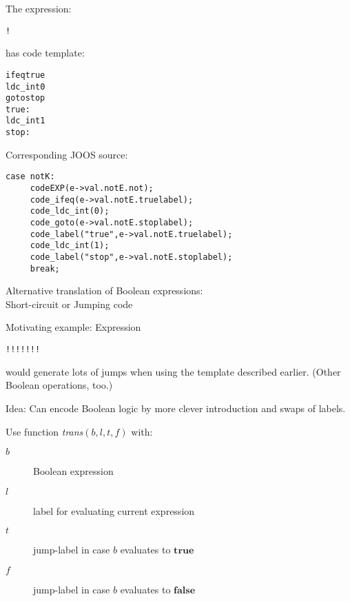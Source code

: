 \begin{slide*}
The expression:
 
\begin{scriptsize}
\begin{alltt}
    !
\end{alltt}
\end{scriptsize}
 
has code template:
 
\begin{scriptsize}
\begin{alltt}
    ifeq true
    ldc_int 0
    goto stop
    true:
    ldc_int 1
    stop:
\end{alltt}
\end{scriptsize}
 
Corresponding JOOS source:
 
\begin{scriptsize}
\begin{verbatim}
case notK:
     codeEXP(e->val.notE.not);
     code_ifeq(e->val.notE.truelabel);
     code_ldc_int(0);
     code_goto(e->val.notE.stoplabel);
     code_label("true",e->val.notE.truelabel);
     code_ldc_int(1);
     code_label("stop",e->val.notE.stoplabel);
     break;
\end{verbatim}
\end{scriptsize}
\vfil
\end{slide*}

\begin{slide*}
Alternative translation of Boolean expressions:\\
Short-circuit or Jumping code

Motivating example: Expression
\begin{center} 
\verb"!!!!!!!"
\end{center}
would generate lots of jumps when
using the template described earlier. (Other Boolean operations, too.)

Idea: Can encode Boolean logic by more clever introduction and swaps of
labels.

Use function {\sl trans}$(b,l,t,f)$ with:
\begin{description}
\item[$b$] Boolean expression
\item[$l$] label for evaluating current expression
\item[$t$] jump-label in case $b$ evaluates to $\mathbf{true}$ 
\item[$f$] jump-label in case $b$ evaluates to $\mathbf{false}$
\end{description}

\vfil 
\end{slide*}

